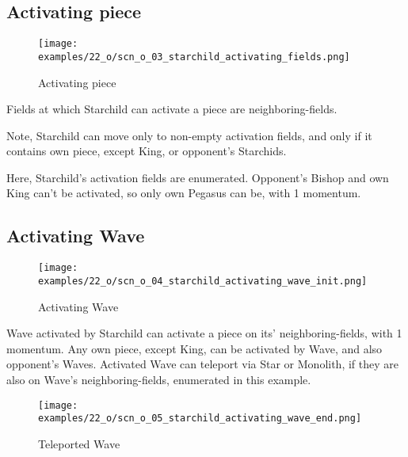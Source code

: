 \vspace*{1.1\baselineskip}
\subsection*{Activating piece}

\vspace*{-0.9\baselineskip}
\noindent
\begin{wrapfigure}[7]{l}{0.4\textwidth}
\centering
\texttt{[image: examples/22\_o/scn\_o\_03\_starchild\_activating\_fields.png]}
\caption{Activating piece}
\label{fig:scn_o_03_starchild_activating_fields}
\end{wrapfigure}
Fields at which Starchild can activate a piece are neighboring-fields.

Note, Starchild can move only to non-empty activation fields, and only if it contains
own piece, except King, or opponent's Starchids.

Here, Starchild’s activation fields are enumerated. Opponent's Bishop and own King can't
be activated, so only own Pegasus can be, with 1 momentum.

\vspace*{-1.1\baselineskip}
\subsection*{Activating Wave}

\vspace*{-0.9\baselineskip}
\noindent
\begin{wrapfigure}[10]{l}{0.4\textwidth}
\centering
\texttt{[image: examples/22\_o/scn\_o\_04\_starchild\_activating\_wave\_init.png]}
\caption{Activating Wave}
\label{fig:scn_o_04_starchild_activating_wave_init}
\end{wrapfigure}
Wave activated by Starchild can activate a piece on its' neighboring-fields, with 1 momentum.
Any own piece, except King, can be activated by Wave, and also opponent's Waves.
Activated Wave can teleport via Star or Monolith, if they are also on Wave's neighboring-fields,
enumerated in this example.

\clearpage %

\vspace*{-2.1\baselineskip}
\noindent
\begin{figure}[!h]
\texttt{[image: examples/22\_o/scn\_o\_05\_starchild\_activating\_wave\_end.png]}
\caption{Teleported Wave}
\label{fig:scn_o_05_starchild_activating_wave_end}
\end{figure}

